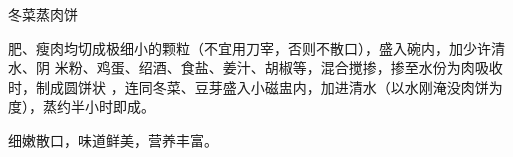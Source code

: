 \begin{recipe}{冬菜蒸肉饼}

\ingredients


\preparation

肥、瘦肉均切成极细小的颗粒（不宜用刀宰，否则不散口），盛入碗内，加少许清水、阴
米粉、鸡蛋、绍酒、食盐、姜汁、胡椒等，混合搅掺，掺至水份为肉吸收时，制成圆饼状
，连同冬菜、豆芽盛入小磁盅内，加进清水（以水刚淹没肉饼为度），蒸约半小时即成。

\features

细嫩散口，味道鲜美，营养丰富。

\end{recipe}

